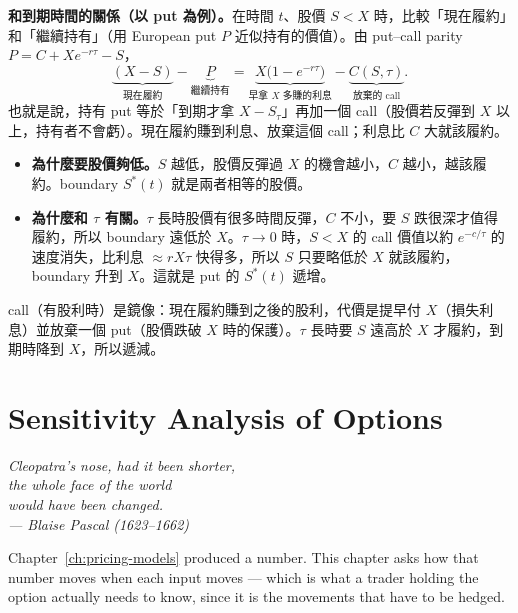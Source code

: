 \begin{remark}
	\textbf{和到期時間的關係（以 put 為例）。}在時間 $t$、股價 $S<X$ 時，比較「現在履約」和「繼續持有」（用 European put $P$ 近似持有的價值）。由 put--call parity $P=C+Xe^{-r\tau}-S$，
	\[
		\underbrace{(X-S)}_{\text{現在履約}}-\underbrace{P}_{\text{繼續持有}}
		=\underbrace{X\bigl(1-e^{-r\tau}\bigr)}_{\text{早拿 $X$ 多賺的利息}}-\underbrace{C(S,\tau)}_{\text{放棄的 call}} .
	\]
	也就是說，持有 put 等於「到期才拿 $X-S_{\tau}$」再加一個 call（股價若反彈到 $X$ 以上，持有者不會虧）。現在履約賺到利息、放棄這個 call；利息比 $C$ 大就該履約。
	\begin{itemize}[nosep]
		\item \textbf{為什麼要股價夠低。}$S$ 越低，股價反彈過 $X$ 的機會越小，$C$ 越小，越該履約。boundary $S^{*}(t)$ 就是兩者相等的股價。
		\item \textbf{為什麼和 $\tau$ 有關。}$\tau$ 長時股價有很多時間反彈，$C$ 不小，要 $S$ 跌很深才值得履約，所以 boundary 遠低於 $X$。$\tau\to0$ 時，$S<X$ 的 call 價值以約 $e^{-c/\tau}$ 的速度消失，比利息 $\approx rX\tau$ 快得多，所以 $S$ 只要略低於 $X$ 就該履約，boundary 升到 $X$。這就是 put 的 $S^{*}(t)$ 遞增。
	\end{itemize}
	call（有股利時）是鏡像：現在履約賺到之後的股利，代價是提早付 $X$（損失利息）並放棄一個 put（股價跌破 $X$ 時的保護）。$\tau$ 長時要 $S$ 遠高於 $X$ 才履約，到期時降到 $X$，所以遞減。
\end{remark}
\suppend

\chapter{Sensitivity Analysis of Options}
\label{ch:greeks}


\begin{flushright}
	\itshape Cleopatra's nose, had it been shorter,\\
	the whole face of the world\\
	would have been changed.\\
	\upshape --- Blaise Pascal (1623--1662)
\end{flushright}

\bigskip

\suppstart
\noindent Chapter~\ref{ch:pricing-models} produced a number.
This chapter asks how that number moves when each input moves --- which is what a trader holding the option actually needs to know, since it is the movements that have to be hedged.

